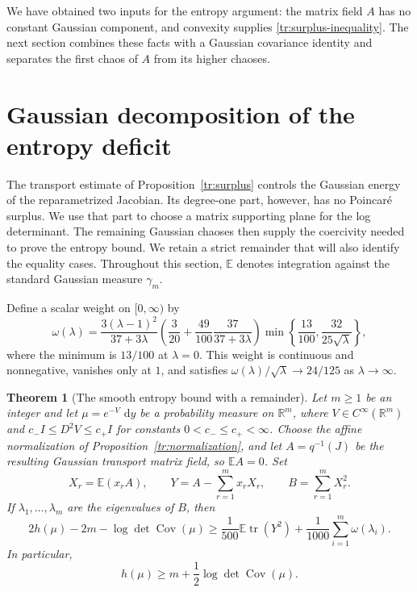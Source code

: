 \documentclass[11pt]{article}
\newcommand{\R}{\mathbb R}
\newcommand{\E}{\mathbb E}
\DeclareMathOperator{\tr}{tr}
\DeclareMathOperator{\Cov}{Cov}
\newcommand{\Id}{I}
\newcommand{\dd}{\,\mathrm d}
\newtheorem{theorem}{Theorem}[section]
\theoremstyle{definition}
\theoremstyle{remark}
\numberwithin{equation}{section}
\begin{document}
We have obtained two inputs for the entropy argument: the matrix field
$A$ has no constant Gaussian component, and convexity supplies
\eqref{tr:surplus-inequality}.  The next section combines these facts
with a Gaussian covariance identity and separates the first chaos of
$A$ from its higher chaoses.

\section{Gaussian decomposition of the entropy deficit}
\label{mat:section}

The transport estimate of Proposition~\ref{tr:surplus} controls the
Gaussian energy of the reparametrized Jacobian.  Its degree-one part,
however, has no Poincar\'e surplus.  We use that part to choose a matrix
supporting plane for the log determinant.  The remaining Gaussian
chaoses then supply the coercivity needed to prove the entropy bound.
We retain a strict remainder that will also identify the equality cases.
Throughout this section, $\E$ denotes integration against the standard
Gaussian measure $\gamma_m$.

Define a scalar weight on $[0,\infty)$ by
\begin{equation}\label{mat:rigidity-weight}
 \omega(\lambda)=
 \frac{3(\lambda-1)^2}{37+3\lambda}
 \left(\frac3{20}+\frac{49}{100}\frac{37}{37+3\lambda}\right)
 \min\left\{\frac{13}{100},\frac{32}{25\sqrt\lambda}\right\},
\end{equation}
where the minimum is $13/100$ at $\lambda=0$.
This weight is continuous and nonnegative, vanishes only at $1$, and
satisfies $\omega(\lambda)/\sqrt\lambda\to24/125$ as
$\lambda\to\infty$.

\begin{theorem}[The smooth entropy bound with a remainder]
\label{mat:entropy-smooth}\label{prop:slack}
Let $m\ge1$ be an integer and let $\mu=e^{-V}\,\dd y$ be a
probability measure on $\R^m$, where
$V\in C^\infty(\R^m)$ and
$c_-\Id\le D^2V\le c_+\Id$ for constants $0<c_-\le c_+<\infty$.
Choose the affine normalization of Proposition~\ref{tr:normalization},
and let $A=q^{-1}(J)$ be the resulting Gaussian transport matrix field,
so $\E A=0$.  Set
\[
 X_r=\E(x_rA),\qquad Y=A-\sum_{r=1}^m x_rX_r,\qquad
 B=\sum_{r=1}^mX_r^2.
\]
If $\lambda_1,\ldots,\lambda_m$ are the eigenvalues of $B$, then
\begin{equation}\label{mat:strict-remainder}
 2h(\mu)-2m-\log\det\Cov(\mu)
 \ge \frac1{500}\E\tr(Y^2)
       +\frac1{1000}\sum_{i=1}^m\omega(\lambda_i).
\end{equation}
In particular,
\[
 h(\mu)\ge m+\frac12\log\det\Cov(\mu).
\]
\end{theorem}
\end{document}
